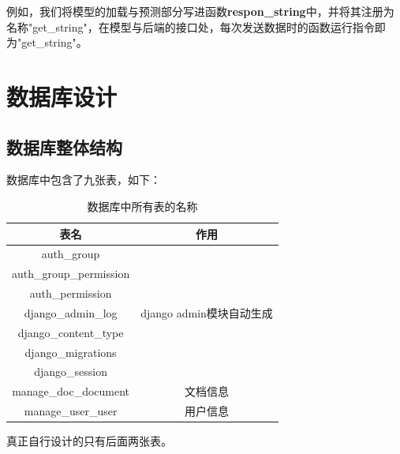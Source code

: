 \documentclass[12pt]{article}
\begin{document}
例如，我们将模型的加载与预测部分写进函数\textbf{respon\_string}中，并将其注册为名称"get\_string"，在模型与后端的接口处，每次发送数据时的函数运行指令即为"get\_string"。

\section{数据库设计}  %
\subsection{数据库整体结构}
数据库中包含了九张表，如下：
\begin{table}[h]
\caption{数据库中所有表的名称}
\centering
\begin{tabular}{|c|c|}
\hline
表名                      & 作用                                  \\ \hline
auth\_group             & \multirow{7}{*}{django admin模块自动生成} \\ \cline{1-1}
auth\_group\_permission &                                     \\ \cline{1-1}
auth\_permission        &                                     \\ \cline{1-1}
django\_admin\_log      &                                     \\ \cline{1-1}
django\_content\_type   &                                     \\ \cline{1-1}
django\_migrations      &                                     \\ \cline{1-1}
django\_session         &                                     \\ \hline
manage\_doc\_document   & 文档信息                                \\ \hline
manage\_user\_user      & 用户信息                                \\ \hline
\end{tabular}
\end{table}

\newpage
真正自行设计的只有后面两张表。
\end{document}
